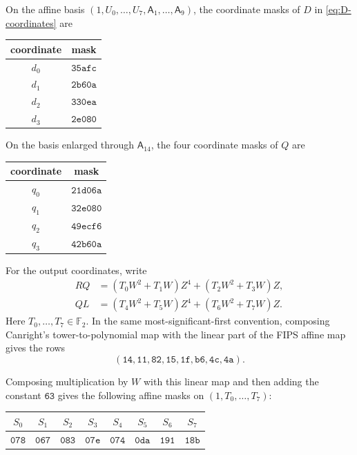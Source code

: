 \documentclass[11pt]{article}
\newcommand{\F}{\mathbb F}
\newcommand{\gate}[1]{\mathsf A_{#1}}
\begin{document}
\begin{samepage}
On the affine basis
\((1,U_0,\ldots,U_7,\gate{1},\ldots,\gate{9})\), the coordinate masks of
\(D\) in \eqref{eq:D-coordinates} are
\begin{center}
\begin{tabular}{@{}cc@{}}
\toprule
coordinate&mask\\
\midrule
\(d_0\)&\(\mathtt{35afc}\)\\
\(d_1\)&\(\mathtt{2b60a}\)\\
\(d_2\)&\(\mathtt{330ea}\)\\
\(d_3\)&\(\mathtt{2e080}\)\\
\bottomrule
\end{tabular}
\end{center}
\end{samepage}
\medskip

\begin{samepage}
On the basis enlarged through \(\gate{14}\), the four coordinate masks of
\(Q\) are
\begin{center}
\begin{tabular}{@{}cc@{}}
\toprule
coordinate&mask\\
\midrule
\(q_0\)&\(\mathtt{21d06a}\)\\
\(q_1\)&\(\mathtt{32e080}\)\\
\(q_2\)&\(\mathtt{49ecf6}\)\\
\(q_3\)&\(\mathtt{42b60a}\)\\
\bottomrule
\end{tabular}
\end{center}
\end{samepage}
\medskip

For the output coordinates, write
\begin{align*}
 RQ&=(T_0W^2+T_1W)Z^4+(T_2W^2+T_3W)Z,\\
 QL&=(T_4W^2+T_5W)Z^4+(T_6W^2+T_7W)Z.
\end{align*}
Here \(T_0,\ldots,T_7\in\F_2\).
In the same most-significant-first convention, composing Canright's
tower-to-polynomial map \cite[Sec.~4, Eq.~(10)]{canright} with the linear
part of the FIPS affine map
\cite[Sec.~5.1.1, Eq.~(5.4)]{fips} gives the rows
\[
 (\mathtt{14},\mathtt{11},\mathtt{82},\mathtt{15},
   \mathtt{1f},\mathtt{b6},\mathtt{4c},\mathtt{4a}).
\]
\begin{samepage}
Composing multiplication by \(W\) with this linear map and then adding the
constant \(\mathtt{63}\) gives the following affine masks on
\((1,T_0,\ldots,T_7)\):
\begin{center}
\begin{tabular}{@{}cccccccc@{}}
\toprule
\(S_0\)&\(S_1\)&\(S_2\)&\(S_3\)&\(S_4\)&\(S_5\)&\(S_6\)&\(S_7\)\\
\midrule
\(\mathtt{078}\)&\(\mathtt{067}\)&\(\mathtt{083}\)&\(\mathtt{07e}\)&
\(\mathtt{074}\)&\(\mathtt{0da}\)&\(\mathtt{191}\)&\(\mathtt{18b}\)\\
\bottomrule
\end{tabular}
\end{center}
\end{samepage}
\end{document}
